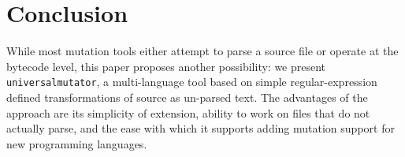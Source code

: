 \section{Conclusion}

While most mutation tools either attempt to parse a source file or
operate at the bytecode level, this paper proposes another
possibility:  we present {\tt universalmutator}, a multi-language tool based on simple regular-expression
defined transformations of source as un-parsed text.  The advantages
of the approach are its simplicity of extension, ability to work on files that do
not actually parse, and the ease with which it supports adding
mutation support for new programming languages.